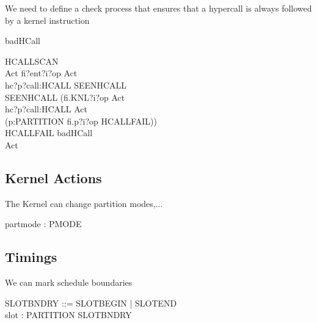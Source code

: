  We need to define a check process that ensures that a hypercall is always
followed by a kernel instruction
\begin{circus}
	\circchannel badHCall
\end{circus}
\begin{circus}
\circprocess HCALLSCAN \circdef \circbegin\\
  Act \circdef fi?ent?i?op     \then  Act\\
              \extchoice  hc?p?call:HCALL \then  SEENHCALL\\
  SEENHCALL \circdef (fi.KNL?i?op     \then  Act\\
	             \extchoice  hc?p?call:HCALL \then  Act\\
	             \extchoice  (\Extchoice  p:PARTITION \circspot fi.p?i?op \then  HCALLFAIL))\\
  HCALLFAIL \circdef badHCall \then  \Stop\\
\circspot Act\\
\circend

\end{circus}

\subsection{Kernel Actions}%
  The Kernel can change partition modes,...

\begin{circus}
	\circchannel partmode : PMODE
\end{circus}
\subsection{Timings}%
  We can mark schedule boundaries

\begin{circus}
	SLOTBNDRY ::= SLOTBEGIN | SLOTEND\\
	\circchannel slot : PARTITION \cross SLOTBNDRY
\end{circus}

